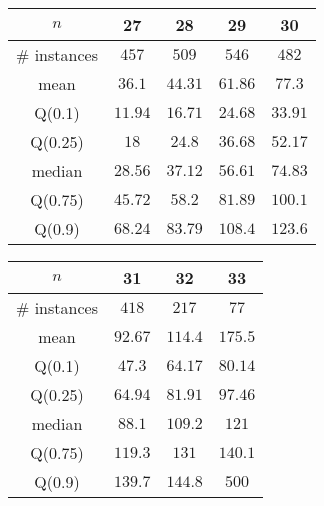 \begin{tabular}{c|cccc} 
\hline 
$n$ & 27 & 28 & 29 & 30 \tabularnewline 
\hline 
\hline 
\# instances & $457$ & $509$ & $546$ & $482$ \tabularnewline 
mean & $36.1$ & $44.31$ & $61.86$ & $77.3$ \tabularnewline 
Q(0.1) & $11.94$ & $16.71$ & $24.68$ & $33.91$ \tabularnewline 
Q(0.25) & $18$ & $24.8$ & $36.68$ & $52.17$ \tabularnewline 
median & $28.56$ & $37.12$ & $56.61$ & $74.83$ \tabularnewline 
Q(0.75) & $45.72$ & $58.2$ & $81.89$ & $100.1$ \tabularnewline 
Q(0.9) & $68.24$ & $83.79$ & $108.4$ & $123.6$ \tabularnewline 
\hline 
\end{tabular} 
\medskip{} 

\begin{tabular}{c|ccc} 
\hline 
$n$ & 31 & 32 & 33 \tabularnewline 
\hline 
\hline 
\# instances & $418$ & $217$ & $77$ \tabularnewline 
mean & $92.67$ & $114.4$ & $175.5$ \tabularnewline 
Q(0.1) & $47.3$ & $64.17$ & $80.14$ \tabularnewline 
Q(0.25) & $64.94$ & $81.91$ & $97.46$ \tabularnewline 
median & $88.1$ & $109.2$ & $121$ \tabularnewline 
Q(0.75) & $119.3$ & $131$ & $140.1$ \tabularnewline 
Q(0.9) & $139.7$ & $144.8$ & $500$ \tabularnewline 
\hline 
\end{tabular} 
\medskip{} 

